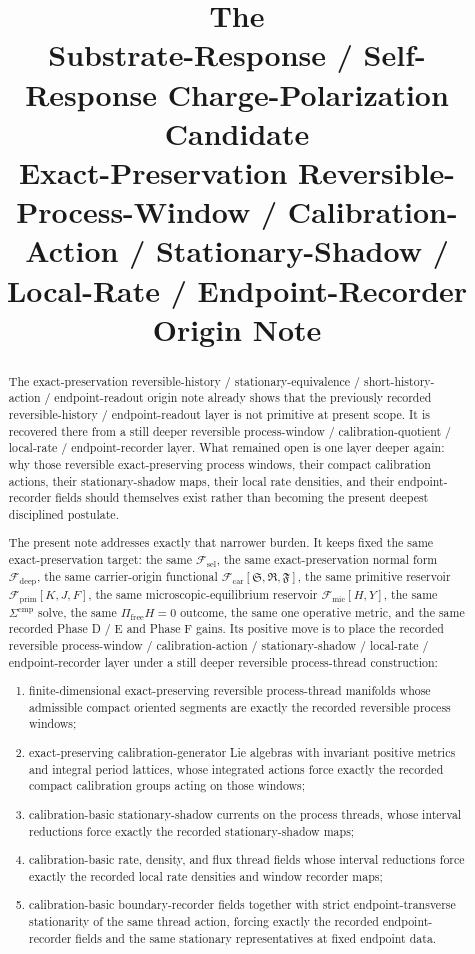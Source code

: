 \documentclass[11pt]{article}
\title{\textbf{The \TheoryName{}}\\[0.4em]
\large Substrate-Response / Self-Response Charge-Polarization Candidate\\
\large Exact-Preservation Reversible-Process-Window / Calibration-Action / Stationary-Shadow / Local-Rate / Endpoint-Recorder\\
\large Origin Note}
\author{}
\date{}
\newcommand{\GaugeAux}{Y}
\newcommand{\MicFunctional}{\mathscr F_{\mathrm{mic}}}
\newcommand{\PrimFunctional}{\mathscr F_{\mathrm{prim}}}
\newcommand{\CarrierFunctional}{\mathscr F_{\mathrm{car}}}
\newcommand{\DeepFunctional}{\mathscr F_{\mathrm{deep}}}
\newcommand{\StemFunctional}{\mathscr F_{\mathrm{sel}}}
\newcommand{\PrimStrain}{K}
\newcommand{\PrimNeutral}{J}
\newcommand{\PrimFree}{F}
\newcommand{\CarrierSeed}{\mathfrak S}
\newcommand{\RelabelSeed}{\mathfrak R}
\newcommand{\FreeSeed}{\mathfrak F}
\begin{document}
\maketitle

\begin{abstract}
The exact-preservation reversible-history / stationary-equivalence / short-history-action / endpoint-readout origin note already shows that the previously recorded reversible-history / endpoint-readout layer is not primitive at present scope. It is recovered there from a still deeper reversible process-window / calibration-quotient / local-rate / endpoint-recorder layer. What remained open is one layer deeper again: why those reversible exact-preserving process windows, their compact calibration actions, their stationary-shadow maps, their local rate densities, and their endpoint-recorder fields should themselves exist rather than becoming the present deepest disciplined postulate.

The present note addresses exactly that narrower burden. It keeps fixed the same exact-preservation target: the same \(\StemFunctional\), the same exact-preservation normal form \(\DeepFunctional\), the same carrier-origin functional \(\CarrierFunctional[\CarrierSeed,\RelabelSeed,\FreeSeed]\), the same primitive reservoir \(\PrimFunctional[\PrimStrain,\PrimNeutral,\PrimFree]\), the same microscopic-equilibrium reservoir \(\MicFunctional[H,\GaugeAux]\), the same \(\Sigma^{\mathrm{cmp}}\) solve, the same \(\Pi_{\mathrm{free}}H=0\) outcome, the same one operative metric, and the same recorded Phase D / E and Phase F gains. Its positive move is to place the recorded reversible process-window / calibration-action / stationary-shadow / local-rate / endpoint-recorder layer under a still deeper reversible process-thread construction:
\begin{enumerate}
    \item finite-dimensional exact-preserving reversible process-thread manifolds whose admissible compact oriented segments are exactly the recorded reversible process windows;
    \item exact-preserving calibration-generator Lie algebras with invariant positive metrics and integral period lattices, whose integrated actions force exactly the recorded compact calibration groups acting on those windows;
    \item calibration-basic stationary-shadow currents on the process threads, whose interval reductions force exactly the recorded stationary-shadow maps;
    \item calibration-basic rate, density, and flux thread fields whose interval reductions force exactly the recorded local rate densities and window recorder maps;
    \item calibration-basic boundary-recorder fields together with strict endpoint-transverse stationarity of the same thread action, forcing exactly the recorded endpoint-recorder fields and the same stationary representatives at fixed endpoint data.
\end{enumerate}


\end{abstract}
\end{document}
